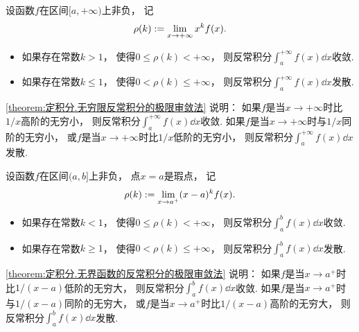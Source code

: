 \begin{theorem}[极限审敛法1]\label{theorem:定积分.无穷限反常积分的极限审敛法}
设函数\(f\)在区间\([a,+\infty)\)上非负，
记\[
	\rho(k) := \lim_{x\to+\infty} x^k f(x).
\]
\begin{itemize}
	\item 如果存在常数\(k > 1\)，
	使得\(0 \leq \rho(k) < +\infty\)，
	则反常积分\(\int_a^{+\infty} f(x) \dd{x}\)收敛.
	\item 如果存在常数\(k \leq 1\)，
	使得\(0 < \rho(k) \leq +\infty\)，
	则反常积分\(\int_a^{+\infty} f(x) \dd{x}\)发散.
\end{itemize}
\end{theorem}
\begin{remark}
\cref{theorem:定积分.无穷限反常积分的极限审敛法} 说明：
如果\(f\)是当\(x\to+\infty\)时比\(1/x\)高阶的无穷小，
则反常积分\(\int_a^{+\infty} f(x) \dd{x}\)收敛.
如果\(f\)是当\(x\to+\infty\)时与\(1/x\)同阶的无穷小，
或\(f\)是当\(x\to+\infty\)时比\(1/x\)低阶的无穷小，
则反常积分\(\int_a^{+\infty} f(x) \dd{x}\)发散.
\end{remark}

\begin{theorem}[极限审敛法2]\label{theorem:定积分.无界函数的反常积分的极限审敛法}
设函数\(f\)在区间\((a,b]\)上非负，
点\(x=a\)是瑕点，
记\[
	\rho(k) := \lim_{x\to a^+} (x-a)^k f(x).
\]
\begin{itemize}
	\item 如果存在常数\(k < 1\)，
	使得\(0 \leq \rho(k) < +\infty\)，
	则反常积分\(\int_a^b f(x) \dd{x}\)收敛.

	\item 如果存在常数\(k \geq 1\)，
	使得\(0 < \rho(k) \leq +\infty\)，
	则反常积分\(\int_a^b f(x) \dd{x}\)发散.
\end{itemize}
\end{theorem}
\begin{remark}
\cref{theorem:定积分.无界函数的反常积分的极限审敛法} 说明：
如果\(f\)是当\(x \to a^+\)时比\(1/(x-a)\)低阶的无穷大，
则反常积分\(\int_a^b f(x) \dd{x}\)收敛.
如果\(f\)是当\(x \to a^+\)时与\(1/(x-a)\)同阶的无穷大，
或\(f\)是当\(x \to a^+\)时比\(1/(x-a)\)高阶的无穷大，
则反常积分\(\int_a^b f(x) \dd{x}\)发散.
\end{remark}

